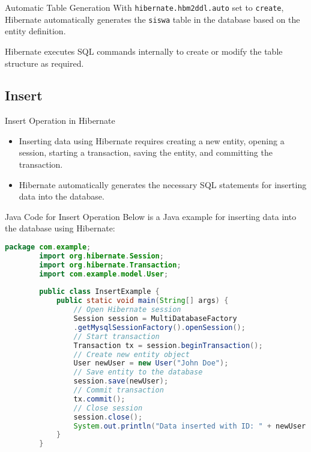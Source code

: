 \documentclass[aspectratio=169, table]{beamer}
\begin{document}
	\begin{frame}{Automatic Table Generation}
		\vspace{20pt}
		With \texttt{hibernate.hbm2ddl.auto} set to \texttt{create}, Hibernate automatically generates the \texttt{siswa} table in the database based on the entity definition.
		
		Hibernate executes SQL commands internally to create or modify the table structure as required.
	\end{frame}


\subsection{Insert}

\begin{frame}{Insert Operation in Hibernate}
	\vspace{20pt}
	\begin{itemize}
		\item Inserting data using Hibernate requires creating a new entity, opening a session, starting a transaction, saving the entity, and committing the transaction.
		\item Hibernate automatically generates the necessary SQL statements for inserting data into the database.
	\end{itemize}
\end{frame}

\begin{frame}[fragile]{Java Code for Insert Operation}
	\vspace{20pt}
	Below is a Java example for inserting data into the database using Hibernate:
	
	\begin{lstlisting}[language=Java, style=JavaStyle]
		package com.example;
		import org.hibernate.Session;
		import org.hibernate.Transaction;
		import com.example.model.User;
		
		public class InsertExample {
			public static void main(String[] args) {
				// Open Hibernate session
				Session session = MultiDatabaseFactory
				.getMysqlSessionFactory().openSession();
				// Start transaction
				Transaction tx = session.beginTransaction();
				// Create new entity object
				User newUser = new User("John Doe");
				// Save entity to the database
				session.save(newUser);
				// Commit transaction
				tx.commit();
				// Close session
				session.close();
				System.out.println("Data inserted with ID: " + newUser.getId());
			}
		}
	\end{lstlisting}
\end{frame}
\end{document}
